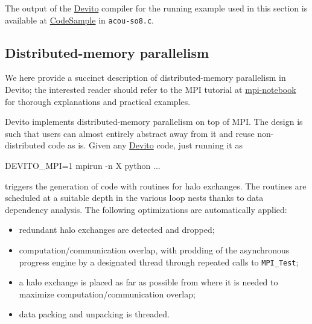 \documentclass[10pt, conference]{IEEEtran}
\newenvironment{Shaded}{}{}
\newcommand{\DecValTok}[1]{\textcolor[rgb]{0.25,0.63,0.44}{{#1}}}
\newcommand{\NormalTok}[1]{{#1}}
\newcommand{\devito}{\href{https://github.com/devitocodes/devito}{Devito} }
\begin{document}
The output of the \devito compiler for the running example used in this
section is available at
\href{https://github.com/mloubout/SC20Paper/tree/master/codesamples}{CodeSample}
in \texttt{acou-so8.c}.

\subsection{Distributed-memory
parallelism}\label{distributed-memory-parallelism}

We here provide a succinct description of distributed-memory parallelism
in Devito; the interested reader should refer to the MPI tutorial at
\href{https://github.com/devitocodes/devito/blob/v4.2/examples/mpi/overview.ipynb}{mpi-notebook}
for thorough explanations and practical examples.

Devito implements distributed-memory parallelism on top of MPI. The design
is such that users can almost entirely abstract away from it and reuse
non-distributed code as is. Given any \devito code, just running it as

\begin{Shaded}
\begin{Highlighting}[]
\NormalTok{DEVITO_MPI=}\DecValTok{1} \NormalTok{mpirun -n X python ...}
\end{Highlighting}
\end{Shaded}

\noindent
triggers the generation of code with routines for halo exchanges. The
routines are scheduled at a suitable depth in the various loop nests
thanks to data dependency analysis. The following optimizations are
automatically applied:

\begin{itemize}
\itemsep1pt\parskip0pt
\item
  redundant halo exchanges are detected and dropped;
\item
  computation/communication overlap, with prodding of the asynchronous
  progress engine by a designated thread through repeated calls to
  \texttt{MPI\_Test};
\item
  a halo exchange is placed as far as possible from where it is needed
  to maximize computation/communication overlap;
\item
  data packing and unpacking is threaded.
\end{itemize}
\end{document}
